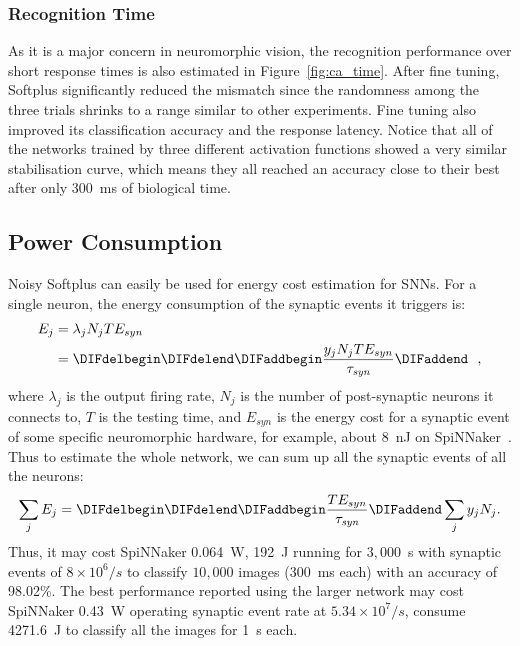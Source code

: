 	\subsubsection{Recognition Time}
	As it is a major concern in neuromorphic vision, the recognition performance over short response times is also estimated in Figure~\ref{fig:ca_time}.
	After fine tuning, Softplus significantly reduced the mismatch since the randomness among the three trials shrinks to a range similar to other experiments.
	Fine tuning also improved its classification accuracy and the response latency.
	Notice that all of the networks trained by three different activation functions showed a very similar stabilisation curve, which means they all reached an accuracy close to their best after only 300~ms of biological time. 

	
	\subsection{Power Consumption}
	\label{subsec:result_power}
	Noisy Softplus can easily be used for energy cost estimation for SNNs.
	For a single neuron, the energy consumption of the synaptic events it triggers is:
	\begin{equation}
	\begin{aligned}
	E_{j} &= \lambda_j N_j T E_{syn}\\
	&= \DIFdelbegin %
\DIFdelend \DIFaddbegin \dfrac{y_j N_j T E_{syn}}{\tau_{\textit{\textrm{syn}}}}\DIFaddend ~~,
	\end{aligned}
	\label{equ:energy}
	\end{equation}
	where $\lambda_j$ is the output firing rate, $N_j$ is the number of post-synaptic neurons it connects to, $T$ is the testing time, and $E_{syn}$ is the energy cost for a synaptic event of some specific neuromorphic hardware, for example, about 8~nJ on SpiNNaker~\citep{stromatias2013power}.
	Thus to estimate the whole network, we can sum up all the synaptic events of all the neurons:
	\begin{equation}
	\sum_j E_{j} =  \DIFdelbegin %
\DIFdelend \DIFaddbegin \dfrac{T E_{syn}}{\tau_{\textit{\textrm{syn}}}} \DIFaddend \sum_{j}y_j N_j.
	\end{equation}
	Thus, it may cost SpiNNaker 0.064~W, 192~J running for $3,000$~s with synaptic events of $8\times10^6/s$ to classify $10,000$ images (300~ms each) with an accuracy of 98.02\%.
	The best performance reported using the larger network may cost SpiNNaker 0.43~W operating synaptic event rate at $5.34\times10^7/s$, consume 4271.6~J to classify all the images for 1~s each.


